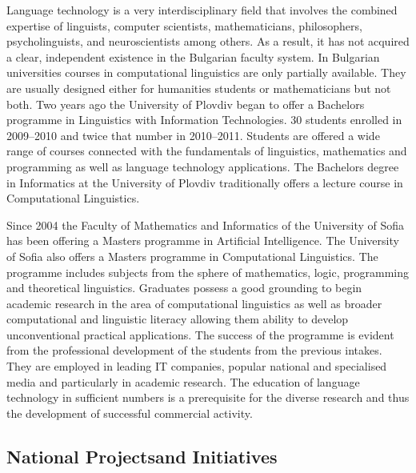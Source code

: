 \begin{multicols}{2}
  Language technology is a very interdisciplinary field that involves the combined expertise of linguists, computer scientists, mathematicians, philosophers, psycholinguists, and neuroscientists among others. As a result, it has not acquired a clear, independent existence in the Bulgarian faculty system. In Bulgarian universities courses in computational linguistics are only partially available. They are usually designed either for humanities students or mathematicians but not both. Two years ago the University of Plovdiv began to offer a Bachelors programme in Linguistics with Information Technologies. 30 students enrolled in 2009--2010 and twice that number in 2010--2011. Students are offered a wide range of courses connected with the fundamentals of linguistics, mathematics and programming as well as language technology applications. The Bachelors degree in Informatics at the University of Plovdiv traditionally offers a lecture course in Computational Linguistics. 

  Since 2004 the Faculty of Mathematics and Informatics of the University of Sofia has been offering a Masters programme in Artificial Intelligence. The University of Sofia also offers a Masters programme in Computational Linguistics. The programme includes subjects from the sphere of mathematics, logic, programming and theoretical linguistics. Graduates possess a good grounding to begin academic research in the area of computational linguistics as well as broader computational and linguistic literacy allowing them ability to develop unconventional practical applications. The success of the programme is evident from the professional development of the students from the previous intakes. They are employed in leading IT companies, popular national and specialised media and particularly in academic research.
  The education of language technology in sufficient numbers is a prerequisite for the diverse research and thus the development of successful commercial activity.

  \subsection[National Projects and Initiatives]{National Projects\newline and Initiatives}


\end{multicols}
